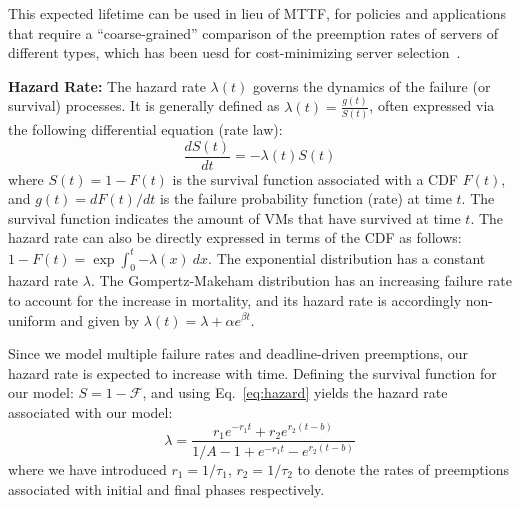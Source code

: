 This expected lifetime can be used in lieu of MTTF, for policies and applications that require a ``coarse-grained'' comparison of the preemption rates of servers of different types, which has been uesd for cost-minimizing server selection~\cite{flint}. 


\noindent \textbf{Hazard Rate:}
The hazard rate $\lambda(t)$ governs the dynamics of the failure (or survival) processes. It is generally defined as $\lambda(t) = \frac{g(t)}{S(t)}$, often expressed via the following differential equation (rate law):
\begin{equation}\label{eq:hazard}
\frac{dS(t)}{dt} = -\lambda(t) S(t)
\end{equation}
where $S(t) = 1 - F(t)$ is the survival function associated with a CDF $F(t)$, and $g(t)=dF(t)/dt$ is the failure probability function (rate) at time $t$. The survival function indicates the amount of VMs that have survived at time $t$.
The hazard rate can also be directly expressed in terms of the CDF as follows: $1-F(t) = \exp{\int_0^t{-\lambda(x) ~dx}}$. 
The exponential distribution has a constant hazard rate $\lambda$.
The Gompertz-Makeham distribution has an increasing failure rate to account for the increase in mortality, and its hazard rate is accordingly non-uniform and given by $\lambda(t) = \lambda + \alpha e^{\beta t}$.

Since we model multiple failure rates and deadline-driven preemptions, our hazard rate is expected to increase with time. Defining the survival function for our model: $S = 1 - \mathscr{F}$, and using Eq.~\ref{eq:hazard} yields the hazard rate associated with our model: 
\noindent 
\begin{equation}
  \label{eq:hmodel}
  \lambda %
  = \dfrac{r_1 e^{- r_1 t} + r_2 e^{r_2 (t - b)}}{1/A - 1 + e^{- r_1 t} - e^{r_2 (t - b)}}
\end{equation}
where we have introduced $r_1 = 1/\tau_1$, $r_2 = 1/\tau_2$ to denote the rates of preemptions associated with initial and final phases respectively.

